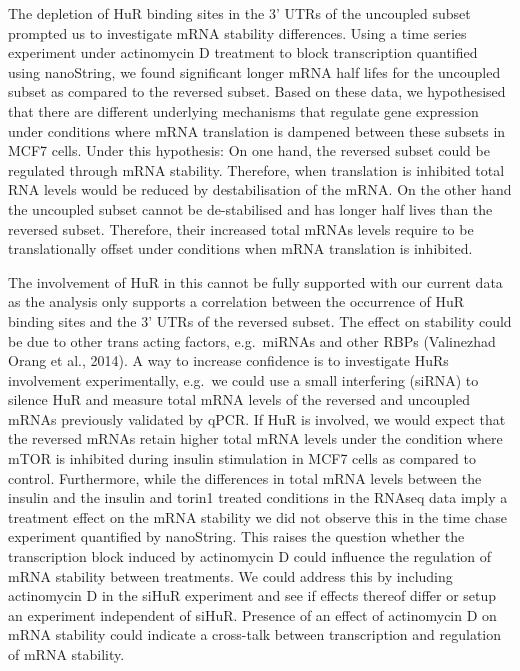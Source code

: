 \documentclass[12pt,openany]{book}
\begin{document}
The depletion of HuR binding sites in the 3' UTRs of the uncoupled
subset prompted us to investigate mRNA stability differences. Using a
time series experiment under actinomycin D treatment to block
transcription quantified using nanoString, we found significant longer
mRNA half lifes for the uncoupled subset as compared to the reversed
subset. Based on these data, we hypothesised that there are different
underlying mechanisms that regulate gene expression under conditions
where mRNA translation is dampened between these subsets in MCF7 cells.
Under this hypothesis: On one hand, the reversed subset could be
regulated through mRNA stability. Therefore, when translation is
inhibited total RNA levels would be reduced by destabilisation of the
mRNA. On the other hand the uncoupled subset cannot be de-stabilised and
has longer half lives than the reversed subset. Therefore, their
increased total mRNAs levels require to be translationally offset under
conditions when mRNA translation is inhibited.

The involvement of HuR in this cannot be fully supported with our
current data as the analysis only supports a correlation between the
occurrence of HuR binding sites and the 3' UTRs of the reversed subset.
The effect on stability could be due to other trans acting factors,
e.g.~miRNAs and other RBPs (Valinezhad Orang et al., 2014). A way to
increase confidence is to investigate HuRs involvement experimentally,
e.g.~we could use a small interfering (siRNA) to silence HuR and measure
total mRNA levels of the reversed and uncoupled mRNAs previously
validated by qPCR. If HuR is involved, we would expect that the reversed
mRNAs retain higher total mRNA levels under the condition where mTOR is
inhibited during insulin stimulation in MCF7 cells as compared to
control. Furthermore, while the differences in total mRNA levels between
the insulin and the insulin and torin1 treated conditions in the RNAseq
data imply a treatment effect on the mRNA stability we did not observe
this in the time chase experiment quantified by nanoString. This raises
the question whether the transcription block induced by actinomycin D
could influence the regulation of mRNA stability between treatments. We
could address this by including actinomycin D in the siHuR experiment
and see if effects thereof differ or setup an experiment independent of
siHuR. Presence of an effect of actinomycin D on mRNA stability could
indicate a cross-talk between transcription and regulation of mRNA
stability.
\end{document}
